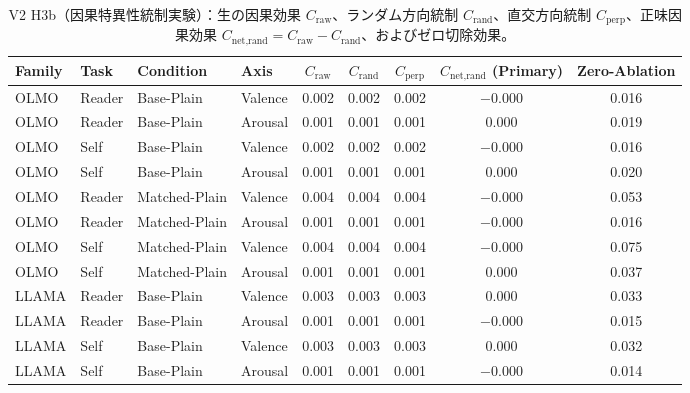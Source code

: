 \begin{table}[htbp]
\centering
\small
\caption{V2 H3b（因果特異性統制実験）：生の因果効果 $C_{\text{raw}}$、ランダム方向統制 $C_{\text{rand}}$、直交方向統制 $C_{\text{perp}}$、正味因果効果 $C_{\text{net,rand}} = C_{\text{raw}} - C_{\text{rand}}$、およびゼロ切除効果。}
\label{tab:v2_causal_controls}
\begin{tabular}{llll ccccc}
\toprule
\textbf{Family} & \textbf{Task} & \textbf{Condition} & \textbf{Axis} & $C_{\text{raw}}$ & $C_{\text{rand}}$ & $C_{\text{perp}}$ & $C_{\text{net,rand}}$ (\textbf{Primary}) & Zero-Ablation \\
\midrule
OLMO       & Reader   & Base-Plain       & Valence  & 0.002      & 0.002      & 0.002      & $-$0.000           & 0.016        \\
OLMO       & Reader   & Base-Plain       & Arousal  & 0.001      & 0.001      & 0.001      & 0.000              & 0.019        \\
OLMO       & Self     & Base-Plain       & Valence  & 0.002      & 0.002      & 0.002      & $-$0.000           & 0.016        \\
OLMO       & Self     & Base-Plain       & Arousal  & 0.001      & 0.001      & 0.001      & 0.000              & 0.020        \\
OLMO       & Reader   & Matched-Plain    & Valence  & 0.004      & 0.004      & 0.004      & $-$0.000           & 0.053        \\
OLMO       & Reader   & Matched-Plain    & Arousal  & 0.001      & 0.001      & 0.001      & $-$0.000           & 0.016        \\
OLMO       & Self     & Matched-Plain    & Valence  & 0.004      & 0.004      & 0.004      & $-$0.000           & 0.075        \\
OLMO       & Self     & Matched-Plain    & Arousal  & 0.001      & 0.001      & 0.001      & 0.000              & 0.037        \\
LLAMA      & Reader   & Base-Plain       & Valence  & 0.003      & 0.003      & 0.003      & 0.000              & 0.033        \\
LLAMA      & Reader   & Base-Plain       & Arousal  & 0.001      & 0.001      & 0.001      & $-$0.000           & 0.015        \\
LLAMA      & Self     & Base-Plain       & Valence  & 0.003      & 0.003      & 0.003      & 0.000              & 0.032        \\
LLAMA      & Self     & Base-Plain       & Arousal  & 0.001      & 0.001      & 0.001      & $-$0.000           & 0.014        \\

\end{tabular}
\end{table}
